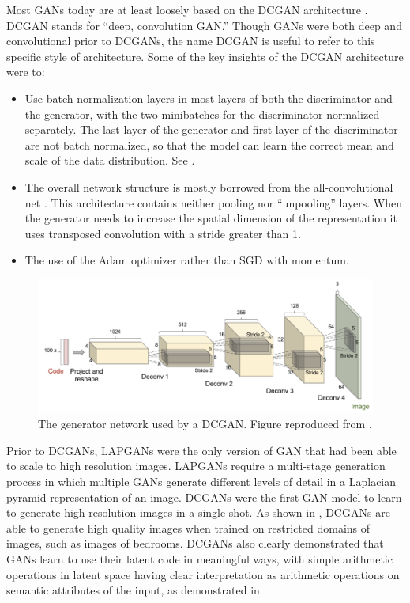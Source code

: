 Most GANs today are at least loosely based on the DCGAN architecture \citep{radford2015unsupervised}.
DCGAN stands for ``deep, convolution GAN.'' Though GANs were both deep and convolutional prior to
DCGANs, the name DCGAN is useful to refer to this specific style of architecture.
Some of the key insights of the DCGAN architecture were to:
\begin{itemize}
  \item Use batch normalization \citep{Ioffe+Szegedy-2015} layers in most layers of both the discriminator and the generator,
        with the two minibatches for the discriminator normalized separately.
        The last layer of the generator and first layer of the discriminator are not batch normalized,
        so that the model can learn the correct mean and scale of the data distribution.
        See .
  \item The overall network structure is mostly borrowed from the all-convolutional net \citep{Springenberg2015}.
        This architecture contains neither pooling nor ``unpooling'' layers.
        When the generator needs to increase the spatial dimension of the representation
        it uses transposed convolution with a stride greater than 1.
  \item The use of the Adam optimizer rather than SGD with momentum.
\end{itemize}

\begin{figure}
\centering
\includegraphics[width=\textwidth]{dcgan}
  \caption{The generator network used by a DCGAN. Figure reproduced from \citet{radford2015unsupervised}.}
\label{fig:dcgan}
\end{figure}

Prior to DCGANs, LAPGANs \citep{denton2015deep} were the only version of GAN
that had been able to scale to high resolution images.
LAPGANs require a multi-stage generation process in which multiple GANs
generate different levels of detail in a Laplacian pyramid representation
of an image.
DCGANs were the first GAN model to learn to generate high resolution images
in a single shot.
As shown in , DCGANs are able to generate high quality
images when trained on restricted domains of images, such as images of bedrooms.
DCGANs also clearly demonstrated that GANs learn to use their latent code
in meaningful ways, with simple arithmetic operations in latent space
having clear interpretation as arithmetic operations on semantic attributes
of the input, as demonstrated in .


